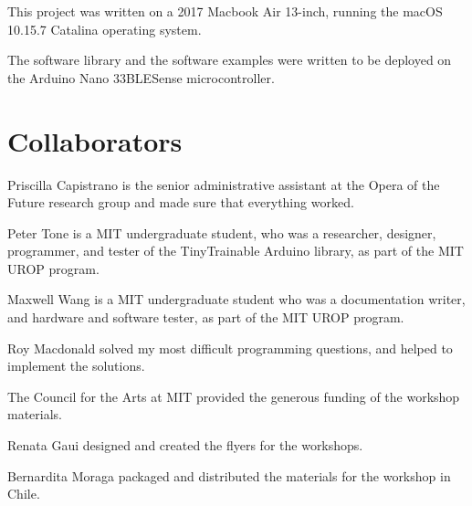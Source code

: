 This project was written on a 2017 Macbook Air 13-inch, running the macOS 10.15.7 Catalina operating system.

The software library and the software examples were written to be deployed on the Arduino Nano 33\acrshort{BLE}Sense microcontroller.

\section{Collaborators}

Priscilla Capistrano is the senior administrative assistant at the Opera of the Future research group and made sure that everything worked.

Peter Tone is a MIT undergraduate student, who was a researcher, designer, programmer, and tester of the TinyTrainable Arduino library, as part of the MIT UROP program.

Maxwell Wang is a MIT undergraduate student who was a documentation writer, and hardware and software tester, as part of the MIT UROP program.

Roy Macdonald solved my most difficult programming questions, and helped to implement the solutions.

The Council for the Arts at MIT provided the generous funding of the workshop materials.

Renata Gaui designed and created the flyers for the workshops.

Bernardita Moraga packaged and distributed the materials for the workshop in Chile.

\newpage
